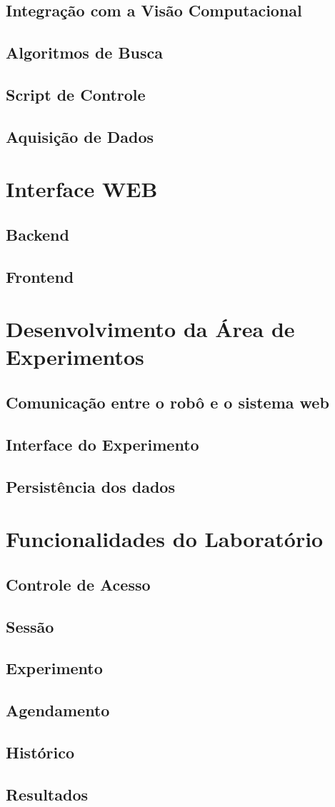\subsection{Integração com a Visão Computacional}
\subsection{Algoritmos de Busca}
\subsection{Script de Controle}
\subsection{Aquisição de Dados}

\section{Interface WEB}
\subsection{Backend}
\subsection{Frontend}

\section{Desenvolvimento da Área de Experimentos}
\subsection{Comunicação entre o robô e o sistema web}
\subsection{Interface do Experimento}
\subsection{Persistência dos dados}

\section{Funcionalidades do Laboratório}
\subsection{Controle de Acesso}
\subsection{Sessão}
\subsection{Experimento}
\subsection{Agendamento}
\subsection{Histórico}
\subsection{Resultados}